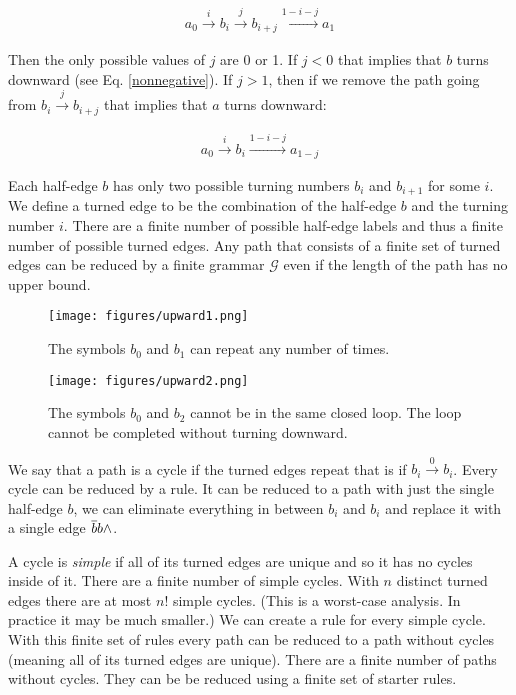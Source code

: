\documentclass[acmtog]{acmart}
\begin{document}
\begin{equation}
\begin{split}
a_0 \xrightarrow{i} b_i \xrightarrow{j} b_{i+j} \xrightarrow{1-i-j} a_{1}
\end{split}
\end{equation}

Then the only possible values of $j$ are 0 or 1. If $j < 0$ that implies that
$b$ turns downward (see Eq. \ref{nonnegative}). If $j > 1$, then if we remove the
path going from $b_i \xrightarrow{j} b_{i+j}$ that implies that $a$ turns downward:

\begin{equation}
\begin{split}
a_0 \xrightarrow{i} b_i \xrightarrow{1-i-j} a_{1-j}
\end{split}
\end{equation}

Each half-edge $b$ has only two possible turning numbers $b_i$ and $b_{i+1}$ for
some $i$. We define a turned edge to be the combination of the half-edge $b$ and
the turning number $i$. There are a finite number of possible half-edge labels
and thus a finite number of possible turned edges. Any path that consists of a
finite set of turned edges can be reduced by a finite grammar $\mathcal{G}$ even
if the length of the path has no upper bound.

\begin{figure}[H]
\centering
\texttt{[image: figures/upward1.png]}
\caption{The symbols $b_0$ and $b_1$ can repeat any number of times.}
\end{figure}

\begin{figure}[H]
\centering
\texttt{[image: figures/upward2.png]}
\caption{The symbols $b_0$ and $b_2$ cannot be in the same closed loop. The loop
cannot be completed without turning downward.}
\end{figure}

We say that a path is a cycle if the turned edges repeat that is if
$b_i \xrightarrow{0} b_i$. Every cycle can be reduced by a rule. It can be
reduced to a path with just the single half-edge $b$, we can eliminate
everything in between $b_i$ and $b_i$ and replace it with a single edge $\overline{b} b {\wedge}$.

A cycle is \textit{simple} if all of its turned edges are unique and so it has no
cycles inside of it. There are a finite number of simple cycles. With $n$
distinct turned edges there are at most $n!$ simple cycles. (This is a
worst-case analysis. In practice it may be much smaller.) We
can create a rule for every simple cycle. With this finite set of rules every
path can be reduced to a path without cycles (meaning all of its turned edges
are unique). There are a finite number of paths without cycles. They can be
be reduced using a finite set of starter rules.
\end{document}
